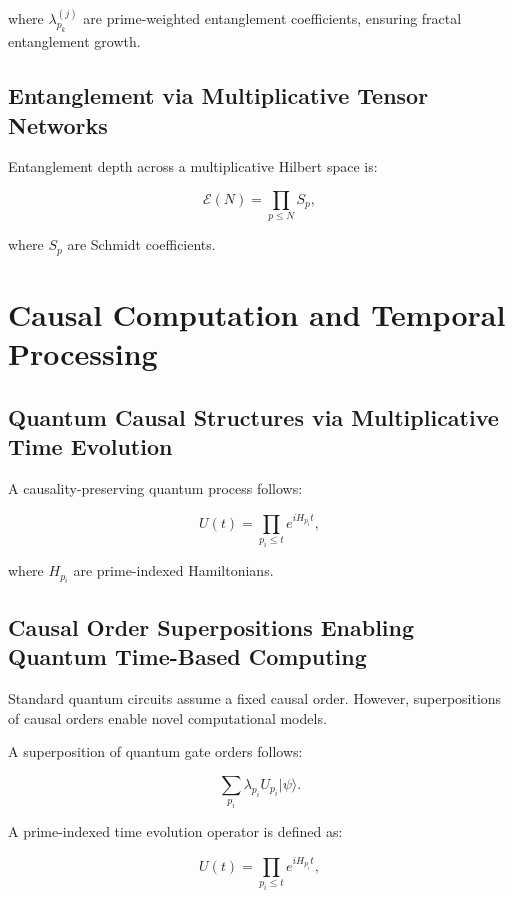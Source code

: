 \documentclass{article}
\theoremstyle{plain}
\begin{document}
where \( \lambda_{p_k}^{(j)} \) are prime-weighted entanglement coefficients, ensuring fractal entanglement growth.


\subsection{Entanglement via Multiplicative Tensor Networks}
Entanglement depth across a multiplicative Hilbert space is:

\begin{equation}
\mathcal{E}(N) = \prod_{p \leq N} S_p,
\end{equation}

where \( S_p \) are Schmidt coefficients.

\section{Causal Computation and Temporal Processing}

\subsection{Quantum Causal Structures via Multiplicative Time Evolution}
A causality-preserving quantum process follows:

\begin{equation}
U(t) = \prod_{p_i \leq t} e^{i H_{p_i} t},
\end{equation}

where \( H_{p_i} \) are prime-indexed Hamiltonians.

\subsection{Causal Order Superpositions Enabling Quantum Time-Based Computing}

Standard quantum circuits assume a fixed causal order. However, superpositions of causal orders enable novel computational models.

A superposition of quantum gate orders follows:

\begin{equation}
\sum_{p_i} \lambda_{p_i} U_{p_i} |\psi\rangle.
\end{equation}

A prime-indexed time evolution operator is defined as:

\begin{equation}
U(t) = \prod_{p_i \leq t} e^{i H_{p_i} t},
\end{equation}
\end{document}
